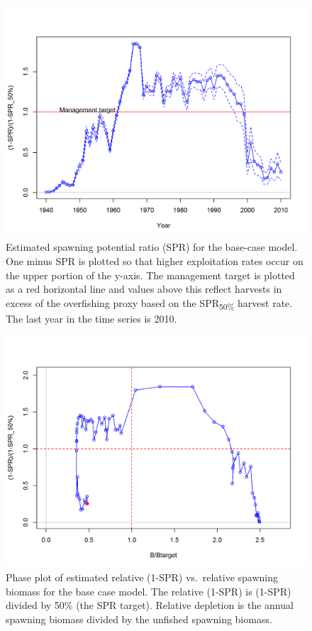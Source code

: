 \documentclass[12pt,]{article}
\begin{document}
\begin{figure}
\centering
\includegraphics{r4ss/plots_mod1/SPR3_ratiointerval.png}
\caption{Estimated spawning potential ratio (SPR) for the base-case
model. One minus SPR is plotted so that higher exploitation rates occur
on the upper portion of the y-axis. The management target is plotted as
a red horizontal line and values above this reflect harvests in excess
of the overfishing proxy based on the SPR\textsubscript{50\%} harvest
rate. The last year in the time series is 2010. \label{fig:SPR_all}}
\end{figure}

\begin{figure}
\centering
\includegraphics{r4ss/plots_mod1/SPR4_phase.png}
\caption{Phase plot of estimated relative (1-SPR) vs.~relative spawning
biomass for the base case model. The relative (1-SPR) is (1-SPR) divided
by 50\% (the SPR target). Relative depletion is the annual spawning
biomass divided by the unfished spawning biomass. \label{fig:Phase_all}}
\end{figure}
\end{document}
